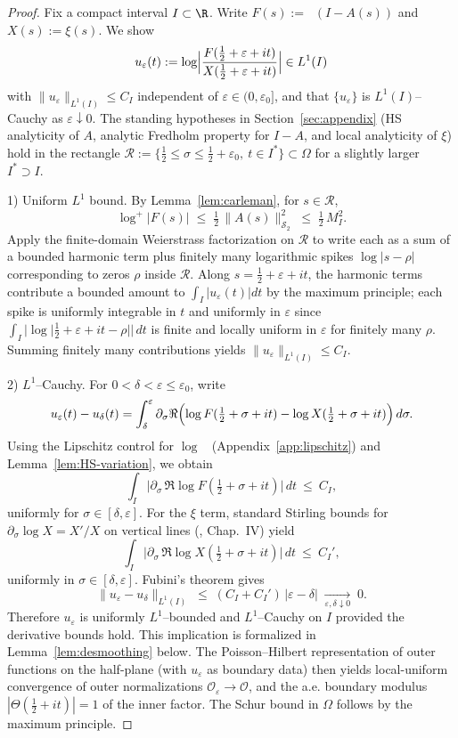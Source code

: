 \documentclass[11pt]{article}
\theoremstyle{remark}
\newcommand{\HS}{\mathcal{S}_2}
\DeclareMathOperator{\dettwo}{det_2}
\begin{document}
\begin{proof}
Fix a compact interval $I\subset\R$. Write $F(s):=\dettwo(I-A(s))$ and $X(s):=\xi(s)$. We show
\[
 u_\varepsilon(t):=\log\Bigl|\frac{F(\tfrac12+\varepsilon+it)}{X(\tfrac12+\varepsilon+it)}\Bigr|\in L^1(I)
\]
with $\|u_\varepsilon\|_{L^1(I)}\le C_I$ independent of \(\varepsilon\in(0,\varepsilon_0]\), and that \(\{u_\varepsilon\}\) is $L^1(I)$–Cauchy as \(\varepsilon\downarrow 0\). The standing hypotheses in Section~\ref{sec:appendix} (HS analyticity of $A$, analytic Fredholm property for $I-A$, and local analyticity of \(\xi\)) hold in the rectangle \(\mathcal R:=\{\tfrac12\le\sigma\le\tfrac12+\varepsilon_0,\ t\in I^{\!*}\}\subset\Omega\) for a slightly larger \(I^{\!*}\supset I\).

1) Uniform $L^1$ bound. By Lemma~\ref{lem:carleman}, for \(s\in\mathcal R\),
\[
 \log^+|F(s)|\;\le\;\tfrac12\,\|A(s)\|_{\HS}^2\;\le\;\tfrac12\,M_I^2.
\]
Apply the finite-domain Weierstrass factorization on \(\mathcal R\) to write each as a sum of a bounded harmonic term plus finitely many logarithmic spikes \(\log|s-\rho|\) corresponding to zeros \(\rho\) inside \(\mathcal R\). Along \(s=\tfrac12+\varepsilon+it\), the harmonic terms contribute a bounded amount to \(\int_I |u_\varepsilon(t)|dt\) by the maximum principle; each spike is uniformly integrable in \(t\) and uniformly in \(\varepsilon\) since \(\int_I |\log|\tfrac12+\varepsilon+it-\rho||\,dt\) is finite and locally uniform in \(\varepsilon\) for finitely many \(\rho\). Summing finitely many contributions yields $\|u_\varepsilon\|_{L^1(I)}\le C_I$.

2) $L^1$–Cauchy. For \(0<\delta<\varepsilon\le\varepsilon_0\), write
\[
 u_\varepsilon(t)-u_\delta(t)
 = \int_{\delta}^{\varepsilon} \partial_\sigma \Re\Bigl(\log F(\tfrac12+\sigma+it)-\log X(\tfrac12+\sigma+it)\Bigr)\,d\sigma.
\]
Using the Lipschitz control for \(\log\dettwo\) (Appendix~\ref{app:lipschitz}) and Lemma~\ref{lem:HS-variation}, we obtain
\[
 \int_I\bigl|\partial_\sigma\,\Re\log F(\tfrac12+\sigma+it)\bigr|\,dt\ \le\ C_I,
\]
uniformly for \(\sigma\in[\delta,\varepsilon]\). For the \(\xi\) term, standard Stirling bounds for \(\partial_\sigma\log X= X'/X\) on vertical lines (\cite{TitchmarshZeta}, Chap.~IV) yield
\[
  \int_I\bigl|\partial_\sigma\,\Re\log X(\tfrac12+\sigma+it)\bigr|\,dt\ \le\ C_I',
\]
uniformly in \(\sigma\in[\delta,\varepsilon]\). Fubini's theorem gives
\[
 \|u_\varepsilon-u_\delta\|_{L^1(I)}\;\le\;(C_I+C_I')\,|\varepsilon-\delta|\;\xrightarrow[\varepsilon,\delta\downarrow 0]{}\;0.
\]
Therefore \(u_\varepsilon\) is uniformly $L^1$–bounded and $L^1$–Cauchy on \(I\) provided the derivative bounds hold. This implication is formalized in Lemma~\ref{lem:desmoothing} below. The Poisson–Hilbert representation of outer functions on the half-plane (with \(u_\varepsilon\) as boundary data) then yields local-uniform convergence of outer normalizations \(\mathcal O_\varepsilon\to \mathcal O\), and the a.e. boundary modulus \(|\Theta(\tfrac12+it)|=1\) of the inner factor. The Schur bound in \(\Omega\) follows by the maximum principle.
\end{proof}
\end{document}
